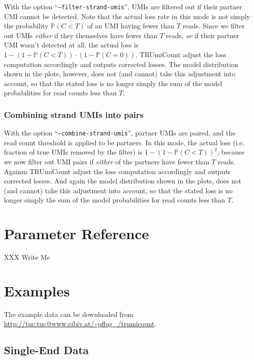 \documentclass[10pt]{article}
\begin{document}
With the option ``\texttt{--filter-strand-umis}'', UMIs are filtered out if their partner UMI cannot be detected. Note that the actual loss rate in this mode is not simply the probability $\mathbb{P}(C < T)$ of an UMI having fewer than $T$ reads. Since we filter out UMIs \emph{either} if they themselves have fewer than $T$ reads, \emph{or} if their partner UMI wasn't detected at all, the actual loss is $1 - (1 - \mathbb{P}(C < T))\cdot (1 - \mathbb{P}(C=0))$. TRUmiCount adjust the loss computation accordingly and outputs corrected losses. The model distribution shown in the plots, however, does not (and cannot) take this adjustment into account, so that the stated loss is no longer simply the sum of the model probabilities for read counts less than $T$.

\subsubsection*{Combining strand UMIs into pairs}

With the option ``\texttt{--combine-strand-umis}'', partner UMIs are paired, and the read count threshold is applied to be partners. In this mode, the actual loss (i.e. fraction of true UMIs removed by the filter) is $1 - (1-\mathbb{P}(C < T))^2$, because we now filter out UMI pairs if \emph{either} of the partners have fewer than $T$ reads. Againm TRUmiCount adjust the loss computation accordingly and outputs corrected losses. And again the model distribution shown in the plots, does not (and cannot) take this adjustment into account, so that the stated loss is no longer simply the sum of the model probabilities for read counts less than $T$.

\section{Parameter Reference}

XXX Write Me

\section{Examples}

The example data can be downloaded from \url{http://tuc:tuc@www.cibiv.at/~pflug_/trumicount}.

\subsection{Single-End Data}
\end{document}
